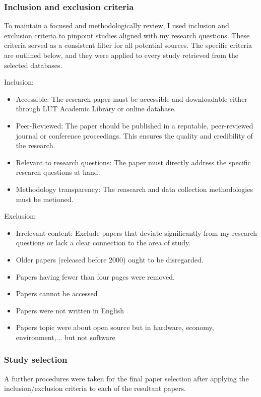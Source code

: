 \subsubsection{Inclusion and exclusion criteria}

To maintain a focused and methodologically review, I used inclusion and exclusion criteria to pinpoint studies aligned with my research questions. These criteria served as a consistent filter for all potential sources. The specific criteria are outlined below, and they were applied to every study retrieved from the selected databases.

Inclusion:
\begin{itemize}
    \item Accessible: The research paper must be accessible and downloadable either through LUT Academic Library or online database.
    \item Peer-Reviewed: The paper should be published in a reputable, peer-reviewed journal or conference proceedings. This ensures the quality and credibility of the research.
    \item Relevant to research questions: The paper must directly address the specific research questions at hand.
    \item Methodology transparency: The reasearch and data collection  methodologies must be metioned.
\end{itemize}

Exclusion:
\begin{itemize}
    \item Irrelevant content: Exclude papers that deviate significantly from my research questions or lack a clear connection to the area of study.
    \item Older papers (released before 2000) ought to be disregarded.
    \item Papers having fewer than four pages were removed.
    \item Papers cannot be accessed
    \item Papers were not written in English
    \item Papers topic were about open source but in hardware, economy, environment,... but not software
\end{itemize}

\subsubsection{Study selection}
A further procedures were taken for the final paper selection after applying the inclusion/exclusion criteria to each of the resultant papers.

